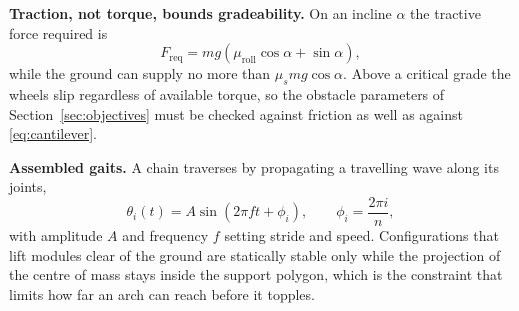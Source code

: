\documentclass[11pt,a4paper]{article}
\newif\ifreview
\newcommand{\pending}[1]{\ifreview{\color{blue}#1}\else#1\fi}
\newcounter{gsec}
\newcounter{gsub}
\newcommand{\curgsec}{}
\newcommand{\gsep}{\texorpdfstring{\quad}{ }}
\newcommand{\gtocsub}[2]{%
  \phantomsection
  \addcontentsline{toc}{subsection}{#1\gsep #2}%
}
\newcommand{\gsubsection}[1]{%
  \refstepcounter{gsub}%
  \edef\gsublbl{\curgsec.\thegsub}%
  \expandafter\gtocsub\expandafter{\gsublbl}{#1}%
  \subsection*{\gsublbl\quad #1}%
}
\begin{document}
{\noindent\textbf{Traction, not torque, bounds gradeability.} On an incline
$\alpha$ the tractive force required is
\begin{equation}
  F_{\text{req}} = mg\left(\mu_{\text{roll}}\cos\alpha + \sin\alpha\right),
\end{equation}
while the ground can supply no more than $\mu_s mg\cos\alpha$. Above a critical
grade the wheels slip regardless of available torque, so the obstacle
parameters of Section~\ref{sec:objectives} must be checked against friction as
well as against \eqref{eq:cantilever}.

\noindent\textbf{Assembled gaits.} A chain traverses by propagating a
travelling wave along its joints,
\begin{equation}
  \theta_i(t) = A\sin\!\left(2\pi f t + \phi_i\right),
  \qquad \phi_i = \frac{2\pi i}{n},
\end{equation}
with amplitude $A$ and frequency $f$ setting stride and speed. Configurations
that lift modules clear of the ground are statically stable only while the
projection of the centre of mass stays inside the support polygon, which is the
constraint that limits how far an arch can reach before it topples.
}

\pending{}
\end{document}
